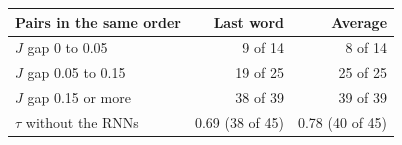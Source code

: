 \begin{tabular}{@{}lrr@{}}
\toprule
Pairs in the same order & Last word & Average \\
\midrule
$J$ gap 0 to 0.05 & 9 of 14 & 8 of 14 \\
$J$ gap 0.05 to 0.15 & 19 of 25 & 25 of 25 \\
$J$ gap 0.15 or more & 38 of 39 & 39 of 39 \\
\midrule
$\tau$ without the RNNs & 0.69 (38 of 45) & 0.78 (40 of 45) \\
\bottomrule
\end{tabular}
